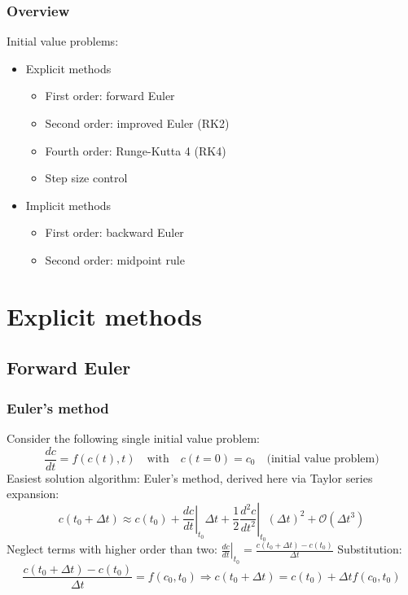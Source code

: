 \documentclass[11pt,table,final,fleqn,xcolor={usenames,dvipsnames,table}]{beamer}
\begin{document}
\begin{frame}
  \frametitle{Overview}
  Initial value problems:
  \begin{itemize}
     \item Explicit methods
    \begin{itemize}
       \item First order: forward Euler
       \item Second order: improved Euler (RK2)
       \item Fourth order: Runge-Kutta 4 (RK4)
       \item Step size control
    \end{itemize}
     \item Implicit methods
    \begin{itemize}
       \item First order: backward Euler
       \item Second order: midpoint rule
    \end{itemize}
  \end{itemize}
\end{frame}

\section{Explicit methods}
\subsection{Forward Euler}
\begin{frame}
  \frametitle{Euler's method}
  Consider the following single initial value problem:
  \[
    \frac{dc}{dt} = f(c(t),t) \quad \text{with} \quad c(t=0)=c_0 \quad \text{(initial value problem)}
  \]
  \pause
  Easiest solution algorithm: Euler's method, derived here via Taylor series expansion:
  \[
    c(t_0 + \Delta t) \approx c(t_0) + \left.\frac{dc}{dt}\right|_{t_0}\Delta t + \frac{1}{2} \left.\frac{d^2c}{dt^2}\right|_{t_0} \left(\Delta t\right) ^2 + \mathcal{O}{(\Delta t^3)}
  \]
  \pause
  Neglect terms with higher order than two: $\left. \frac{dc}{dt}\right|_{t_0} = \frac{c(t_0 + \Delta t) - c(t_0)}{\Delta t}$
  Substitution: 
  \[
    \frac{c(t_0 + \Delta t) - c(t_0)}{\Delta t} = f(c_0,t_0)\Rightarrow c(t_0+\Delta t) = c(t_0) + \Delta t f(c_0,t_0) 
  \]
\end{frame}
\end{document}
